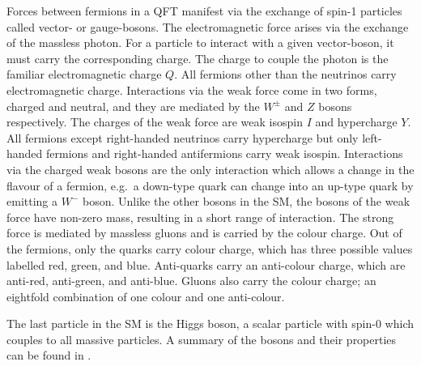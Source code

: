 Forces between fermions in a QFT manifest via the exchange of spin-1 particles called vector- or gauge-bosons.
The electromagnetic force arises via the exchange of the massless photon.
For a particle to interact with a given vector-boson, it must carry the corresponding charge.
The charge to couple the photon is the familiar electromagnetic charge $Q$.
All fermions other than the neutrinos carry electromagnetic charge.
Interactions via the weak force come in two forms, charged and neutral, and they are mediated by the $W^\pm$ and $Z$ bosons respectively.
The charges of the weak force are weak isospin $I$ and hypercharge $Y$.
All fermions except right-handed neutrinos carry hypercharge but only left-handed fermions and right-handed antifermions carry weak isospin.
Interactions via the charged weak bosons are the only interaction which allows a change in the flavour of a fermion, e.g.\ a down-type quark can change into an up-type quark by emitting a $W^-$ boson.
Unlike the other bosons in the SM, the bosons of the weak force have non-zero mass, resulting in a short range of interaction.
The strong force is mediated by massless gluons and is carried by the colour charge.
Out of the fermions, only the quarks carry colour charge, which has three possible values labelled red, green, and blue.
Anti-quarks carry an anti-colour charge, which are anti-red, anti-green, and anti-blue.
Gluons also carry the colour charge; an eightfold combination of one colour and one anti-colour.

The last particle in the SM is the Higgs boson, a scalar particle with spin-0 which couples to all massive particles.
A summary of the bosons and their properties can be found in .

